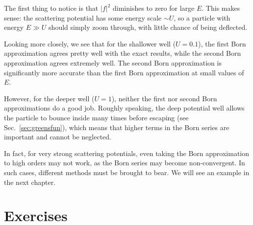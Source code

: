 \documentclass[pra,12pt]{revtex4-2}
\begin{document}
The first thing to notice is that $|f|^2$ diminishes to zero for large
$E$.  This makes sense: the scattering potential has some energy scale
$\sim U$, so a particle with energy $E \gg U$ should simply zoom
through, with little chance of being deflected.

Looking more closely, we see that for the shallower well ($U = 0.1$),
the first Born approximation agrees pretty well with the exact
results, while the second Born approximation agrees extremely well.
The second Born approximation is significantly more accurate than the
first Born approximation at small values of $E$.

However, for the deeper well ($U = 1$), neither the first nor second
Born approximations do a good job.  Roughly speaking, the deep
potential well allows the particle to bounce inside many times before
escaping (see Sec.~\ref{sec:greensfun}), which means that higher terms
in the Born series are important and cannot be neglected.

In fact, for very strong scattering potentials, even taking the Born
approximation to high orders may not work, as the Born series may
become non-convergent.  In such cases, different methods must be
brought to bear.  We will see an example in the next chapter.

\section*{Exercises}
\end{document}
